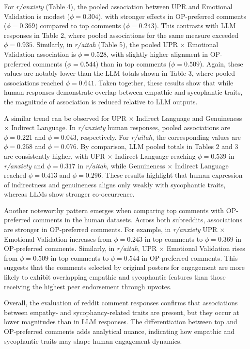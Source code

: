 For \textit{r/anxiety} (Table 4), the pooled association between UPR and Emotional Validation is modest ($\phi = 0.304$), with stronger effects in OP-preferred comments ($\phi = 0.369$) compared to top comments ($\phi = 0.243$). This contrasts with LLM responses in Table 2, where pooled associations for the same measure exceeded $\phi = 0.935$. Similarly, in \textit{r/aitah} (Table 5), the pooled UPR $\times$ Emotional Validation association is $\phi = 0.528$, with slightly higher alignment in OP-preferred comments ($\phi = 0.544$) than in top comments ($\phi = 0.509$). Again, these values are notably lower than the LLM totals shown in Table 3, where pooled associations reached $\phi = 0.641$. Taken together, these results show that while human responses demonstrate overlap between empathic and sycophantic traits, the magnitude of association is reduced relative to LLM outputs.

A similar trend can be observed for UPR $\times$ Indirect Language and Genuineness $\times$ Indirect Language. In \textit{r/anxiety} human responses, pooled associations are $\phi = 0.221$ and $\phi = 0.043$, respectively. For \textit{r/aitah}, the corresponding values are $\phi = 0.258$ and $\phi = 0.076$. By comparison, LLM pooled totals in Tables 2 and 3 are consistently higher, with UPR $\times$ Indirect Language reaching $\phi = 0.539$ in \textit{r/anxiety} and $\phi = 0.317$ in \textit{r/aitah}, while Genuineness $\times$ Indirect Language reached $\phi = 0.413$ and $\phi = 0.296$. These results highlight that human expression of indirectness and genuineness aligns only weakly with sycophantic traits, whereas LLMs show stronger co-occurrence.

Another noteworthy pattern emerges when comparing top comments with OP-preferred comments in the human datasets. Across both subreddits, associations are stronger in OP-preferred comments. For example, in \textit{r/anxiety} UPR $\times$ Emotional Validation increases from $\phi = 0.243$ in top comments to $\phi = 0.369$ in OP-preferred comments. Similarly, in \textit{r/aitah}, UPR $\times$ Emotional Validation rises from $\phi = 0.509$ in top comments to $\phi = 0.544$ in OP-preferred comments. This suggests that the comments selected by original posters for engagement are more likely to exhibit overlapping empathic and sycophantic features than those receiving the highest peer endorsement through upvotes.

Overall, the evaluation of reddit comment responses confirms that associations between empathy- and sycophancy-related traits are present, but they occur at lower magnitudes than in LLM responses. The differentiation between top and OP-preferred comments adds analytical nuance, indicating how empathic and sycophantic traits may shape human engagement dynamics. 


